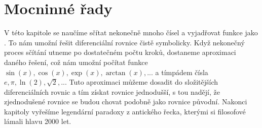 \chapter{Mocninné řady}%
V této kapitole se naučíme sčítat nekonečně mnoho čísel a vyjadřovat funkce jako . To nám umožní řešit diferenciální rovnice čistě symbolicky. Když nekonečný proces sčítání utneme po dostatečném počtu kroků, dostaneme aproximaci daného řešení, což nám umožní počítat funkce $\sin(x),\cos(x),\exp(x),\arctan(x), ...$ a tímpádem čísla $e,\pi, \ln(2),\sqrt{2},...$ Tuto aproximaci můžeme dosadit do složitějších diferenciálních rovnic a tím získat rovnice jednodušší, s tou nadějí, že zjednodušené rovnice se budou chovat podobně jako rovnice původní. Nakonci kapitoly vyřešíme legendární paradoxy z antického řecka, kterými si filosofové lámali hlavu 2000 let.
